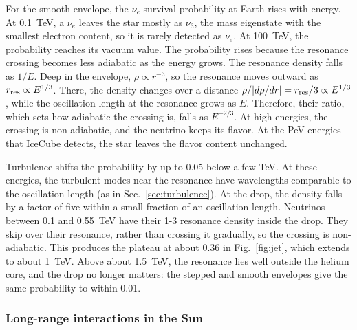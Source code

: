 \documentclass[final,5p,times,twocolumn,sort,compress]{elsarticle}
\makeatletter
\newcommand{\fig}{Fig.}
\DeclareRobustCommand{\_}{%
  \ifmmode\nfss@text{\textunderscore}\else\textunderscore\allowbreak\fi}
\newcommand{\figu}[1]{\fig~\ref{fig:#1}}
\makeatother
\begin{document}
For the smooth envelope, the $\nu_e$ survival probability at Earth rises with energy. At 0.1~TeV, a $\nu_e$ leaves the star mostly as $\nu_3$, the mass eigenstate with the smallest electron content, so it is rarely detected as $\nu_e$. At 100~TeV, the probability reaches its vacuum value. The probability rises because the resonance crossing becomes less adiabatic as the energy grows. The resonance density falls as $1/E$. Deep in the envelope, $\rho \propto r^{-3}$, so the resonance moves outward as $r_{\rm res} \propto E^{1/3}$. There, the density changes over a distance $\rho/\lvert d\rho/dr \rvert = r_{\rm res}/3 \propto E^{1/3}$, while the oscillation length at the resonance grows as $E$. Therefore, their ratio, which sets how adiabatic the crossing is, falls as $E^{-2/3}$. At high energies, the crossing is non-adiabatic, and the neutrino keeps its flavor. At the PeV energies that IceCube detects, the star leaves the flavor content unchanged.

Turbulence shifts the probability by up to 0.05 below a few TeV. At these energies, the turbulent modes near the resonance have wavelengths comparable to the oscillation length (as in Sec.~\ref{sec:turbulence}). At the drop, the density falls by a factor of five within a small fraction of an oscillation length. Neutrinos between 0.1 and 0.55~TeV have their 1-3 resonance density inside the drop. They skip over their resonance, rather than crossing it gradually, so the crossing is non-adiabatic. This produces the plateau at about 0.36 in \figu{jet}, which extends to about 1~TeV. Above about 1.5~TeV, the resonance lies well outside the helium core, and the drop no longer matters: the stepped and smooth envelopes give the same probability to within 0.01.


\subsubsection{Long-range interactions in the Sun}
\label{sec:lri_sun}
\end{document}
